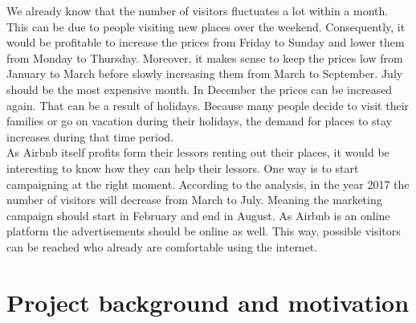 We already know that the number of visitors fluctuates a lot within a month. This can be due to people visiting new places over the weekend. Consequently, it would be profitable to increase the prices from Friday to Sunday and lower them from Monday to Thursday. Moreover, it makes sense to keep the prices low from January to March before slowly increasing them from March to September. July should be the most expensive month. In December the prices can be increased again. That can be a result of holidays. Because many people decide to visit their families or go on vacation during their holidays, the demand for places to stay increases during that time period. \\
As Airbnb itself profits form their lessors renting out their places, it would be interesting to know how they can help their lessors. One way is to start campaigning at the right moment. According to the analysis, in the year 2017 the number of visitors will decrease from March to July. Meaning the marketing campaign should start in February and end in August. As Airbnb is an online platform the advertisements should be online as well. This way, possible visitors can be reached who already are comfortable using the internet. 

%

\section{Project background and motivation}

